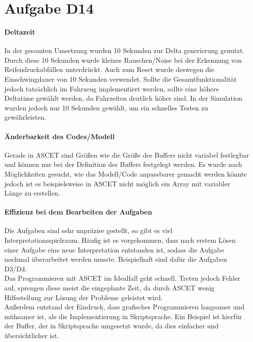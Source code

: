\chapter{Aufgabe D14}
\subsubsection{Deltazeit}
In der gesamten Umsetzung wurden 10 Sekunden zur Delta generierung genutzt. Durch diese 10 Sekunden wurde kleines Rauschen/Noise bei der Erkennung von Reifendruckabfällen unterdrückt. Auch zum Reset wurde deswegen die Einschwingdauer von 10 Sekunden verwendet.
Sollte die Gesamtfunktionalität jedoch tatsächlich im Fahrzeug implementiert werden, sollte eine höhere Deltatime gewählt werden, da Fahrzeiten deutlich höher sind. In der Simulation wurden jedoch nur 10 Sekunden gewählt, um ein schnelles Testen zu gewährleisten.

\subsubsection{Änderbarkeit des Codes/Modell}
Gerade in ASCET sind Größen wie die Größe des Buffers nicht variabel festlegbar und können nur bei der Definition des Buffers festgelegt werden. Es wurde nach Möglichkeiten gesucht, wie das Modell/Code anpassbarer gemacht werden könnte jedoch ist es beispielsweise in ASCET nicht möglich ein Array mit variabler Länge zu erstellen. 

\subsubsection{Effizienz bei dem Bearbeiten der Aufgaben}
Die Aufgaben sind sehr unpräzise gestellt, so gibt es viel Interpretationsspielraum. Häufig ist es vorgekommen, dass nach erstem Lösen einer Aufgabe eine neue Interpretation entstanden ist, sodass die Aufgabe nochmal überarbeitet werden musste. Beispielhaft sind dafür die Aufgaben D3/D4.\\
Das Programmieren mit ASCET im Idealfall geht schnell. Treten jedoch Fehler auf, sprengen diese meist die eingeplante Zeit, da durch ASCET wenig Hilfestellung zur Lösung der Probleme geleistet wird.\\
Außerdem entstand der Eindruck, dass grafisches Programmieren langsamer und mühsamer ist, als die Implementierung in Skriptsprache. Ein Beispiel ist hierfür der Buffer, der in Skriptsprache umgesetzt wurde, da dies einfacher und übersichtlicher ist.\\